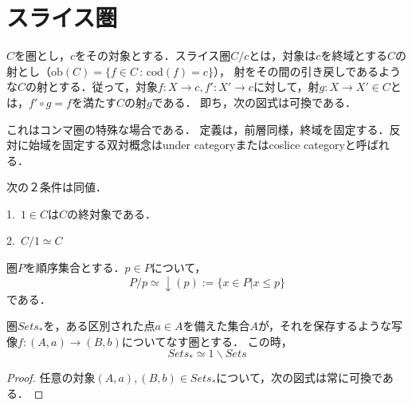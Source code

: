 \documentclass[uplatex, 12pt, dvipdfmx]{jsreport}
\begin{document}
\section{スライス圏}

\begin{definition}
    $C$を圏とし，$c$をその対象とする．スライス圏$C/c$とは，対象は$c$を終域とする$C$の射とし（$\mathrm{ob}(C)=\{f\in C \, :\,\mathrm{cod}(f)=c\} $），
    射をその間の引き戻しであるような$C$の射とする．従って，対象$f:X\to c, f':X'\to c$に対して，射$g:X\to X'\in C$とは，$f'\circ g=f$を満たす$C$の射$g$である．
    即ち，次の図式は可換である．
    \begin{center}\end{center}
\end{definition}
これはコンマ圏の特殊な場合である．
定義は，前層同様，終域を固定する．反対に始域を固定する双対概念はunder categoryまたはcoslice categoryと呼ばれる．

\begin{proposition}
    次の２条件は同値．\rm{}

    1.\, $1\in C$は$C$の終対象である．

    2.\, $C/1\simeq C$
\end{proposition}

\begin{proposition}
    圏$P$を順序集合とする．$p\in P$について，
    $$P/p\simeq\downarrow (p):=\{ x\in P | x\le p \}$$である．
\end{proposition}

\begin{proposition}[Setでの例]
    圏$Sets_*$を，ある区別された点$a\in A$を備えた集合$A$が，それを保存するような写像$f:(A,a)\to (B,b)$についてなす圏とする．
    この時，$$Sets_*\simeq 1\backslash Sets$$
\end{proposition}
\begin{proof}
    任意の対象$(A,a),(B,b)\in Sets_*$について，次の図式は常に可換である．
\end{proof}
\end{document}
